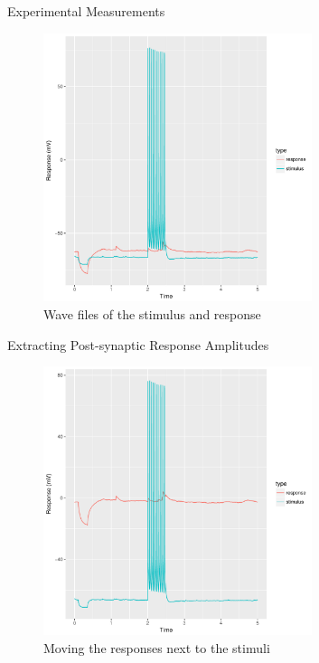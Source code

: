 \documentclass{beamer}
\begin{document}
\begin{frame}{Experimental Measurements}
  \begin{figure}
    \centering
    \includegraphics[width = 0.7\textwidth]{./wave-data.pdf}
    \caption{Wave files of the stimulus and response}
  \end{figure}
\end{frame}

\begin{frame}{Extracting Post-synaptic Response Amplitudes}
  \begin{figure}
    \centering
    \includegraphics[width = 0.7\textwidth]{./wave-data-move.pdf}
    \caption{Moving the responses next to the stimuli}
  \end{figure}
\end{frame}
\end{document}
